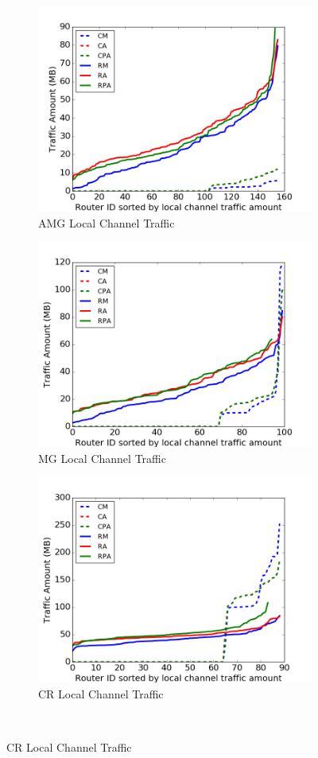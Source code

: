 \documentclass[conference,compsoc]{IEEEtran}
\begin{document}
\begin{figure}[t]
    \centering
    \begin{subfigure}[t]{0.32\textwidth}
        \centering
        \includegraphics[height=1.8 in]{wkld/amg/lc-traffic}
        \caption{AMG Local Channel Traffic}
        \label{fig:amg-lc-traffic}
    \end{subfigure}\hfill
    \hspace{1em}%
    \begin{subfigure}[t]{0.32\textwidth}
        \centering
        \includegraphics[height=1.8 in]{wkld/mg/lc-traffic}
        \caption{MG Local Channel Traffic}
        \label{fig:mg-lc-traffic}
    \end{subfigure}\hfill
    \begin{subfigure}[t]{0.32\textwidth}
        \centering
        \includegraphics[height=1.8 in]{wkld/cr/lc-traffic}
        \caption{CR Local Channel Traffic}
        \label{fig:cr-lc-traffic}
    \end{subfigure}\\


\end{figure}
\end{document}
